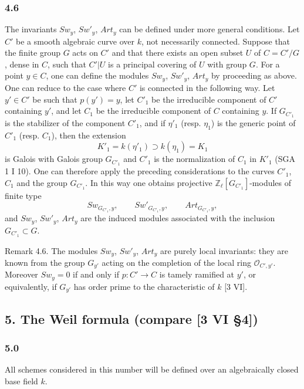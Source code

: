 \documentclass[11pt]{article}
\begin{document}
\subsubsection*{4.6}

The invariants $Sw_y$, $Sw'_y$, $Art_y$ can be defined under more general conditions. Let $C'$ be a smooth algebraic curve over $k$, not necessarily connected. Suppose that the finite group $G$ acts on $C'$ and that there exists an open subset $U$ of $C=C'/G$, dense in $C$, such that $C'|U$ is a principal covering of $U$ with group $G$. For a point $y\in C$, one can define the modules $Sw_y$, $Sw'_y$, $Art_y$ by proceeding as above. One can reduce to the case where $C'$ is connected in the following way. Let $y'\in C'$ be such that $p(y')=y$, let $C'_1$ be the irreducible component of $C'$ containing $y'$, and let $C_1$ be the irreducible component of $C$ containing $y$. If $G_{C'_1}$ is the stabilizer of the component $C'_1$, and if $\eta'_1$ (resp. $\eta_1$) is the generic point of $C'_1$ (resp. $C_1$), then the extension
\[
K'_1=k(\eta'_1)\supset k(\eta_1)=K_1
\]
is Galois with Galois group $G_{C'_1}$ and $C'_1$ is the normalization of $C_1$ in $K'_1$ (SGA 1 I 10). One can therefore apply the preceding considerations to the curves $C'_1$, $C_1$ and the group $G_{C'_1}$. In this way one obtains projective $\mathbb Z_\ell[G_{C'_1}]$-modules of finite type
\[
Sw_{G_{C'_1},y},\qquad Sw'_{G_{C'_1},y},\qquad Art_{G_{C'_1},y},
\]
and $Sw_y$, $Sw'_y$, $Art_y$ are the induced modules associated with the inclusion $G_{C'_1}\subset G$.

Remark 4.6. The modules $Sw_y$, $Sw'_y$, $Art_y$ are purely local invariants: they are known from the group $G_{y'}$ acting on the completion of the local ring $\mathcal O_{C',y'}$. Moreover $Sw_y=0$ if and only if $p:C'\to C$ is tamely ramified at $y'$, or equivalently, if $G_{y'}$ has order prime to the characteristic of $k$ [3 VI].

\subsection*{5. The Weil formula (compare [3 VI §4])}

\subsubsection*{5.0}

All schemes considered in this number will be defined over an algebraically closed base field $k$.
\end{document}
